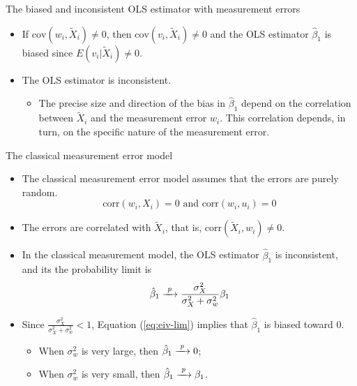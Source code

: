 \documentclass[presentation,10pt]{beamer}
\newcommand{\cov}{\mathrm{cov}}
\newcommand{\corr}{\mathrm{corr}}
\newcommand{\rarrowd}[1]{\xrightarrow{\text{ \textit #1 }}}
\begin{document}
\begin{frame}[label={sec:orga496ca0}]{The biased and inconsistent OLS estimator with measurement errors}
\begin{itemize}
\item If \(\cov(w_i, \tilde{X}_i) \neq 0\), then \(\cov(v_i, \tilde{X}_i)
  \neq 0\) and the OLS estimator \(\hat{\beta}_1\) is biased since
\(E(v_i | \tilde{X}_i) \neq 0\).
\end{itemize}

\vspace{0.3cm}

\begin{itemize}
\item The OLS estimator is inconsistent.
\begin{itemize}
\item The precise size and direction of the bias in \(\hat{\beta}_1\) depend
on the correlation between \(\tilde{X}_i\) and the measurement error
\(w_i\). This correlation depends, in turn, on the specific nature of
the measurement error.
\end{itemize}
\end{itemize}
\end{frame}

\begin{frame}[label={sec:org4c90cf8}]{The classical measurement error model}
\begin{itemize}
\item The classical measurement error model assumes that the errors are
purely random. 
$$\corr(w_i, X_i) = 0 \text{ and }\corr(w_i, u_i) = 0$$

\item The errors are correlated with \(\tilde{X}_i\), that is,
\(\corr(\tilde{X}_i, w_i) \neq 0\).

\item In the classical measurement model, the OLS estimator
\(\hat{\beta}_1\) is inconsistent, and its the probability limit is
\begin{equation}
\label{eq:eiv-lim}
\hat{\beta}_1 \rarrowd{p} \frac{\sigma^2_X}{\sigma^2_X + \sigma^2_w}\beta_1
\end{equation}

\item Since \(\frac{\sigma^2_X}{\sigma^2_X + \sigma^2_w} < 1\), Equation
(\ref{eq:eiv-lim}) implies that
\(\hat{\beta}_1\) is biased toward 0.
\begin{itemize}
\item When \(\sigma^2_w\) is very large, then \(\hat{\beta}_1 \rarrowd{p} 0\);
\item When \(\sigma^2_w\) is very small, then \(\hat{\beta}_1 \rarrowd{p} \beta_1\).
\end{itemize}
\end{itemize}
\end{frame}
\end{document}
